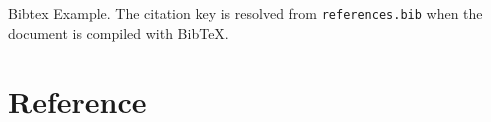 \documentclass[11pt,a4paper,oneside]{report}
\begin{document}
\makecover

\tableofcontents
\clearpage







Bibtex Example\citep{miller2010graphite}. The citation key is resolved from
\texttt{references.bib} when the document is compiled with BibTeX.

\pagebreak
\section*{Reference}
\begingroup
\renewcommand{\bibsection}{}


\endgroup
\end{document}
